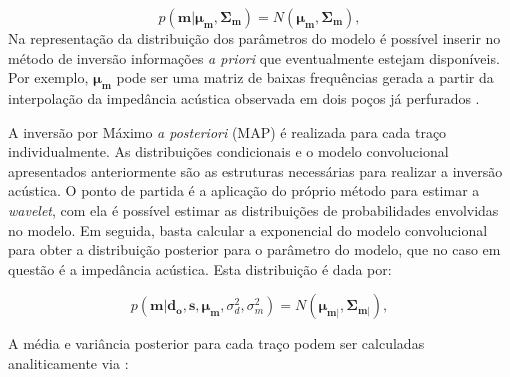 \begin{equation}
\label{eq:pmodelo}
p(\boldsymbol{m}|\boldsymbol{\mu_{m}},\boldsymbol{\Sigma_{m}}) =
N(\boldsymbol{\mu_{m}},\boldsymbol{\Sigma_{m}}),
\end{equation} 
Na representação da distribuição dos parâmetros do modelo é possível inserir no método de inversão informações \textit{a priori}
que eventualmente estejam disponíveis. Por exemplo, $\boldsymbol{\mu_{m}}$ pode ser
uma matriz de baixas frequências gerada a partir da interpolação da impedância acústica observada em dois poços
já perfurados \citep{Figueiredo2014}.

% 
A inversão por Máximo \textit{a posteriori} (MAP)
\citep{Buland01012003,leandroGRSL} é realizada para cada traço individualmente.
As distribuições condicionais e o modelo convolucional apresentados anteriormente
são as estruturas necessárias para realizar a inversão acústica. O ponto de partida
é a aplicação do próprio método para estimar a \textit{wavelet},
com ela é possível estimar as distribuições de probabilidades envolvidas no modelo.
Em seguida, basta calcular a exponencial do modelo convolucional para obter a distribuição posterior
para o parâmetro do modelo, que no caso em questão é a impedância acústica. Esta distribuição é dada por:

\begin{equation}
p(\boldsymbol{m}|\boldsymbol{d_{o}},\boldsymbol{s},\boldsymbol{\mu_{m}},\sigma_{d}^{2},\sigma_{m}^{2}) = 
N(\boldsymbol{\mu_{m|}},\boldsymbol{\Sigma_{m|}}),
\end{equation} 

A média e variância posterior para cada traço podem ser calculadas analiticamente via \citep{leandroGRSL}:

